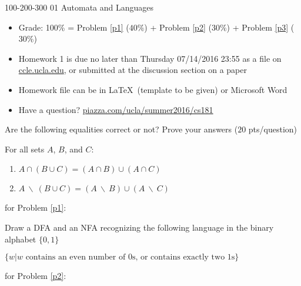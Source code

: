 \documentclass[usletter]{article}
\begin{document}
           {100-200-300}          		%
           {01}                     			%
           {Automata and Languages}	%

\noindent

\begin{itemize}
\item Grade: 100\% = Problem \ref{p1} ($40\%$) + Problem \ref{p2} ($30\%$) + Problem \ref{p3} ($30\%$)
\item Homework 1 is due no later than Thursday 07/14/2016 23:55 as a file on \url{ccle.ucla.edu}, or submitted at the discussion section on a paper
\item Homework file can be in \LaTeX\ (template to be given) or Microsoft Word
\item Have a question? \url{piazza.com/ucla/summer2016/cs181}
\end{itemize}


\bigskip
\begin{problem}
\label{p1}
Are the following equalities correct or not? Prove your answers ($20$ pts/question)


For all sets $A$, $B$, and $C$:
\begin{enumerate}[label=(\alph*)]
\item $A \cap (B \cup C) = (A \cap B) \cup (A \cap C)$
\item $A {\ \backslash\ } (B \cup C) = (A {\ \backslash\ } B) \cup (A {\ \backslash\ } C)$
\end{enumerate}
\end{problem}

\begin{answer}for Problem \ref{p1}:
\end{answer}


\medskip
\begin{problem}
\label{p2}

Draw a DFA and an NFA recognizing the following language in the binary alphabet $\big\{0,1\big\}$

$\big\{ w | w \text{ contains an even number of }0\text{s, or contains exactly two }1\text{s}\big\}$
\end{problem}

\begin{answer}for Problem \ref{p2}:
\end{answer}
\end{document}
